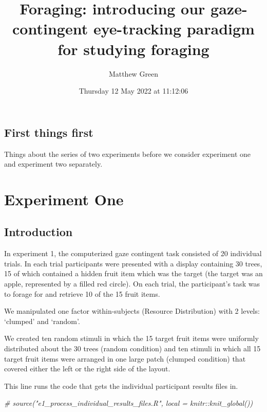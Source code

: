 \documentclass[
]{book}
\title{Foraging: introducing our gaze-contingent eye-tracking paradigm for studying foraging}
\author{Matthew Green}
\date{Thursday 12 May 2022 at 11:12:06}
\newenvironment{Shaded}{\begin{snugshade}}{\end{snugshade}}
\newcommand{\CommentTok}[1]{\textcolor[rgb]{0.56,0.35,0.01}{\textit{#1}}}
\begin{document}
\maketitle

{
\setcounter{tocdepth}{1}
\tableofcontents
}
\hypertarget{first-things-first}{%
\chapter{First things first}\label{first-things-first}}

Things about the series of two experiments before we consider experiment one and experiment two separately.

\hypertarget{part-experiment-one}{%
\part{Experiment One}\label{part-experiment-one}}

\hypertarget{introduction}{%
\chapter{Introduction}\label{introduction}}

In experiment 1, the computerized gaze contingent task consisted of 20 individual trials. In each trial participants were presented with a display containing 30 trees, 15 of which contained a hidden fruit item which was the target (the target was an apple, represented by a filled red circle). On each trial, the participant's task was to forage for and retrieve 10 of the 15 fruit items.

We manipulated one factor within-subjects (Resource Distribution) with 2 levels: `clumped' and `random'.

We created ten random stimuli in which the 15 target fruit items were uniformly distributed about the 30 trees (random condition) and ten stimuli in which all 15 target fruit items were arranged in one large patch (clumped condition) that covered either the left or the right side of the layout.

This line runs the code that gets the individual participant results files in.

\begin{Shaded}
\begin{Highlighting}[]
\CommentTok{\# source("e1\_process\_individual\_results\_files.R", local = knitr::knit\_global())}
\end{Highlighting}
\end{Shaded}
\end{document}
